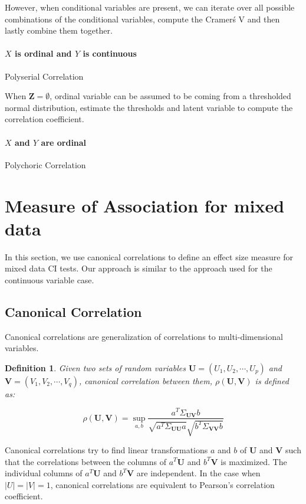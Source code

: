 \documentclass[letterpaper]{article} %
\newtheorem{definition}{Definition}
\begin{document}
However, when conditional variables are present, we can iterate over all
possible combinations of the conditional variables, compute the Cramer\'s V and
then lastly combine them together. 


\paragraph{$ X $ is ordinal and $ Y $ is continuous}
Polyserial Correlation

When $ \bm{Z} = \emptyset $, ordinal variable can be assumed to be coming from a thresholded normal distribution, estimate the thresholds and latent variable to compute 
the correlation coefficient.

\paragraph{$ X $ and $ Y $ are ordinal}
Polychoric Correlation

\section{Measure of Association for mixed data}
In this section, we use canonical correlations to define an effect size measure
for mixed data CI tests. Our approach is similar to the approach used for the
continuous variable case. 

\subsection{Canonical Correlation}
Canonical correlations are generalization of correlations to multi-dimensional variables.

\begin{definition}
	Given two sets of random variables $ \bm{U} = (U_1, U_2, \cdots, U_p) $
	and $ \bm{V} = (V_1, V_2, \cdots, V_q) $, canonical correlation between
	them, $\rho(\bm{U}, \bm{V}) $ is defined as:
		
	\begin{equation}
		\rho(\bm{U}, \bm{V}) = \sup_{a, b} \frac{a^T \Sigma_{\bm{U}\bm{V}} b}{\sqrt{a^T \Sigma_{\bm{U}\bm{U}} a} \sqrt{b^T \Sigma_{\bm{V}\bm{V}} b}}
	\end{equation}

\end{definition}
	
	Canonical correlations try to find linear transformations $ a $ and $ b
	$ of $ \bm{U} $ and $ \bm{V} $ such that the correlations between the
	columns of $ a^T \bm{U} $ and $ b^T \bm{V} $ is maximized. The
	individual columns of $ a^T \bm{U} $ and $ b^T \bm{V} $ are
	independent. In the case when $ \rvert U \rvert = \rvert V \rvert = 1$,
	canonical correlations are equivalent to Pearson's correlation
	coefficient.
\end{document}
